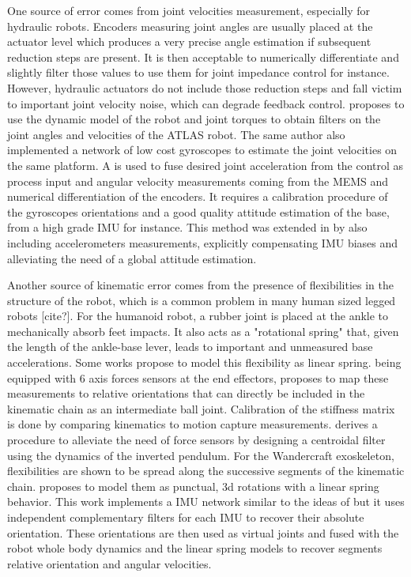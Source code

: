 One source of error comes from joint velocities measurement, especially for hydraulic robots. Encoders measuring joint angles are usually placed 
at the actuator level which produces a very precise angle estimation if subsequent reduction steps are present. It is then acceptable to numerically 
differentiate and slightly filter those values to use them for joint impedance control for instance. However, hydraulic
actuators do not include those reduction steps and fall victim to important joint velocity noise, which can degrade feedback control.
\cite{xinjilefu2014decoupled} proposes to use the dynamic model of the robot and joint torques to obtain filters on the joint angles and velocities
of the ATLAS robot. The same author \cite{xinjilefu2016distributed} also implemented a network of low cost gyroscopes to estimate the joint velocities 
on the same platform. A \KalmanF is used to fuse desired joint acceleration from the control as process input and angular velocity measurements coming from 
the MEMS and numerical differentiation of the encoders. It requires a calibration procedure of the gyroscopes orientations and a good quality attitude
estimation of the base, from a high grade IMU for instance. This method was extended in \cite{rotella2016imu} by also including
accelerometers measurements, explicitly compensating IMU biases and alleviating the need of a global attitude estimation.

Another source of kinematic error comes from the presence of flexibilities in the structure of the robot, which is a common problem in many human sized legged robots [cite?]. 
For the  humanoid robot, a rubber joint is placed at the ankle to mechanically absorb feet impacts. 
It also acts as a "rotational spring" that, given the length of the ankle-base lever, 
leads to important and unmeasured base accelerations. Some works propose to model this flexibility as linear spring.  being equipped with 6 axis 
forces sensors at the end effectors, \cite{flayols2017experimental} proposes to map these measurements to relative orientations that can 
directly be included in the kinematic chain as an intermediate ball joint. Calibration of the stiffness matrix is done by comparing 
kinematics to motion capture measurements. \cite{benallegue2015estimation} derives a procedure to alleviate the need of force sensors by 
designing a centroidal filter using the dynamics of the inverted pendulum. For the Wandercraft exoskeleton, flexibilities
are shown to be spread along the successive segments of the kinematic chain. \cite{vigne2018estimation} proposes to model them as punctual, 
3d rotations with a linear spring behavior. This work implements a IMU network similar to the ideas of \cite{xinjilefu2016distributed,rotella2016imu} 
but it uses independent complementary filters for each IMU to recover their absolute orientation. These orientations are then used as 
virtual joints and fused with the robot whole body dynamics and the linear spring models to recover segments relative orientation and angular velocities.

